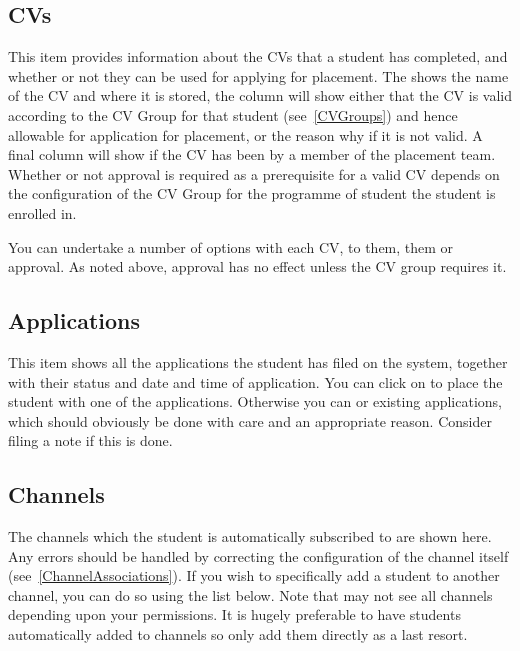 \documentclass[12 pt]{book}
\begin{document}
\subsection{CVs}

This item provides information about the CVs that a student has completed, and
whether or not they can be used for applying for placement. The 
 shows the name of the CV and where it is stored, the 
 column will show either that the CV is valid according to the
CV Group for that student (see~\ref{CVGroups}) and hence
allowable for application for placement, or the reason why if it is not valid. A
final column will show if the CV has been  by a member of the
placement team. Whether or not approval is required as a prerequisite for a
valid CV depends on the configuration of the CV Group for the programme
of student the student is enrolled in.

You can undertake a number of options with each CV, to  them, 
 them or  approval. As noted above, approval has
no effect unless the CV group requires it.

\subsection{Applications}

This item shows all the applications the student has filed on the system, 
together with their status and date and time of application. You can click on
 to place the student with one of the applications. Otherwise you
can  or  existing applications, which should obviously
be done with care and an appropriate reason. Consider filing a note if this is
done.

\subsection{Channels}

The channels which the student is automatically subscribed to are shown here.
Any errors should be handled by correcting the configuration of the channel
itself (see~\ref{ChannelAssociations}). If you wish to specifically add a student to another
channel, you can do so using the list below. Note that may not see all channels
depending upon your permissions. It is hugely preferable to have students
automatically added to channels so only add them directly as a last resort.
\end{document}
